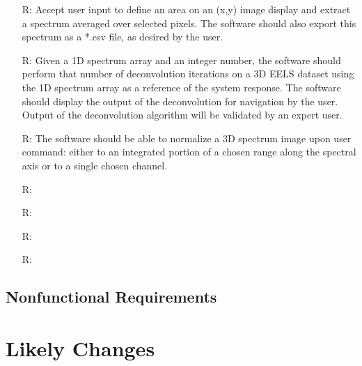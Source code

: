 \documentclass[12pt]{article}
\newcounter{reqnum} %
\begin{document}
\begin{itemize}
\item[R\refstepcounter{reqnum}\thereqnum \label{R_Inputs}:] Accept user input to define an area on an (x,y) image display and extract a spectrum averaged over selected pixels. The software should also export this spectrum as a *.csv file, as desired by the user.

\item[R\refstepcounter{reqnum}\thereqnum \label{R_Inputs}:] Given a 1D spectrum array and an integer number, the software should perform that number of deconvolution iterations on a 3D EELS dataset using the 1D spectrum array as a reference of the system response. The software should display the output of the deconvolution for navigation by the user. Output of the deconvolution algorithm will be validated by an expert user. 

\item[R\refstepcounter{reqnum}\thereqnum \label{R_Inputs}:] The software should be able to normalize a 3D spectrum image upon user command: either to an integrated portion of a chosen range along the spectral axis or to a single chosen channel.

\item[R\refstepcounter{reqnum}\thereqnum \label{R_OutputInputs}:] 

\item[R\refstepcounter{reqnum}\thereqnum \label{R_Calculate}:] 

\item[R\refstepcounter{reqnum}\thereqnum \label{R_VerifyOutput}:]

\item[R\refstepcounter{reqnum}\thereqnum \label{R_Output}:] 

\end{itemize}

\subsection{Nonfunctional Requirements}


\section{Likely Changes}    
\end{document}
